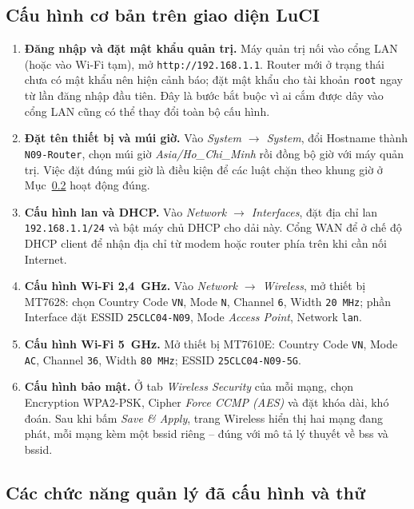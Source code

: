 \subsection{Cấu hình cơ bản trên giao diện LuCI}
\begin{enumerate}[leftmargin=*]
  \item \textbf{Đăng nhập và đặt mật khẩu quản trị.} Máy quản trị nối vào cổng
    LAN (hoặc vào Wi-Fi tạm), mở \texttt{http://192.168.1.1}. Router mới ở trạng
    thái chưa có mật khẩu nên hiện cảnh báo; đặt mật khẩu cho tài khoản
    \texttt{root} ngay từ lần đăng nhập đầu tiên. Đây là bước bắt buộc vì ai cắm
    được dây vào cổng LAN cũng có thể thay đổi toàn bộ cấu hình.
  \item \textbf{Đặt tên thiết bị và múi giờ.} Vào \emph{System $\rightarrow$
    System}, đổi Hostname thành \texttt{N09-Router}, chọn múi giờ
    \emph{Asia/Ho\_Chi\_Minh} rồi đồng bộ giờ với máy quản trị. Việc đặt đúng
    múi giờ là điều kiện để các luật chặn theo khung giờ ở
    Mục~\ref{subsec:cauhinh-nangcao} hoạt động đúng.
  \item \textbf{Cấu hình \ac{lan} và DHCP.} Vào \emph{Network $\rightarrow$
    Interfaces}, đặt địa chỉ \ac{lan} \texttt{192.168.1.1/24} và bật máy chủ DHCP
    cho dải này. Cổng WAN để ở chế độ DHCP client để nhận địa chỉ từ modem hoặc
    router phía trên khi cần nối Internet.
  \item \textbf{Cấu hình Wi-Fi 2,4~GHz.} Vào \emph{Network $\rightarrow$
    Wireless}, mở thiết bị MT7628: chọn Country Code \texttt{VN}, Mode \texttt{N},
    Channel \texttt{6}, Width \texttt{20~MHz}; phần Interface đặt ESSID
    \texttt{25CLC04-N09}, Mode \emph{Access Point}, Network \texttt{lan}.
  \item \textbf{Cấu hình Wi-Fi 5~GHz.} Mở thiết bị MT7610E: Country Code
    \texttt{VN}, Mode \texttt{AC}, Channel \texttt{36}, Width \texttt{80~MHz};
    ESSID \texttt{25CLC04-N09-5G}.
  \item \textbf{Cấu hình bảo mật.} Ở tab \emph{Wireless Security} của mỗi mạng,
    chọn Encryption WPA2-PSK, Cipher \emph{Force CCMP (AES)} và đặt khóa dài, khó
    đoán. Sau khi bấm \emph{Save \& Apply}, trang Wireless hiển thị hai mạng đang
    phát, mỗi mạng kèm một \ac{bssid} riêng -- đúng với mô tả lý thuyết về
    \ac{bss} và \ac{bssid}.
\end{enumerate}

\subsection{Các chức năng quản lý đã cấu hình và thử}
\label{subsec:cauhinh-nangcao}

